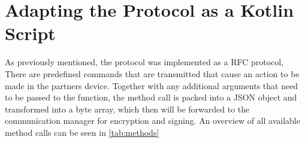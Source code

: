 \section{Adapting the Protocol as a Kotlin Script}

As previously mentioned, the protocol was implemented as a RFC protocol, There are predefined commands that are transmitted that cause an action to be made in the partners device. Together with any additional arguments that need to be passed to the function, the method call is packed into a JSON object and transformed into a byte array, which then will be forwarded to the communication manager for encryption and signing. An overview of all available method calls can be seen in \ref{tab:methods}

\begin{table}[!h]
\end{table}
